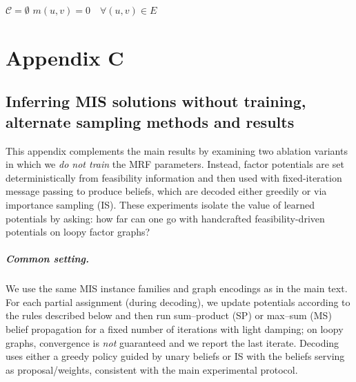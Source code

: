 \begin{appendices}
\begin{algorithm}[H]
\caption{Covering a graph with maximal cliques}\label{alg:clique_cover}
$\mathcal{C} = \emptyset$\;
$m(u,v) = 0 \quad \forall (u,v) \in E$\;
\end{algorithm}


\end{appendices}

\newpage
\pagecolor{lightmauve}
\chapter{Appendix C}
\label{appendix_c}

\section{Inferring MIS solutions without training, alternate sampling methods and results}

This appendix complements the main results by examining two ablation variants in which we \emph{do not train} the MRF parameters. Instead, factor potentials are set deterministically from feasibility information and then used with fixed-iteration message passing to produce beliefs, which are decoded either greedily or via importance sampling (IS). These experiments isolate the value of learned potentials by asking: how far can one go with handcrafted feasibility-driven potentials on loopy factor graphs?

\paragraph{Common setting.}
We use the same MIS instance families and graph encodings as in the main text. For each partial assignment (during decoding), we update potentials according to the rules described below and then run sum–product (SP) or max–sum (MS) belief propagation for a fixed number of iterations with light damping; on loopy graphs, convergence is \emph{not} guaranteed and we report the last iterate. Decoding uses either a greedy policy guided by unary beliefs or IS with the beliefs serving as proposal/weights, consistent with the main experimental protocol.

